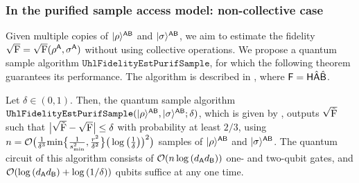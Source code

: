 


\subsubsection{In the purified sample access model: non-collective case}
\label{sec:fidelity estimation PSS}


Given multiple copies of $|\rho\rangle^{{\mathsf{A}}{\mathsf{B}}}$ and $|\sigma\rangle^{{\mathsf{A}}{\mathsf{B}}}$, we aim to estimate the fidelity $\sqrt{{\mathrm{F}}}=\sqrt{{\mathrm{F}}}(\rho^{\mathsf{A}}, \sigma^{\mathsf{A}})$ without using collective operations.
We propose a quantum sample algorithm $\mathtt{UhlFidelityEstPurifSample}$, for which the following theorem guarantees its performance.
The algorithm is described in , where ${\mathsf{F}}={\mathsf{H}}\hat{{\mathsf{A}}}\hat{{\mathsf{B}}}$.


\begin{theorem}
\label{thm:sqrtfidelestpufifsample}
Let $\delta \in (0, 1)$. Then, the quantum sample algorithm $\mathtt{UhlFidelityEstPurifSample}(|\rho\rangle^{{\mathsf{A}}{\mathsf{B}}}, |\sigma\rangle^{{\mathsf{A}}{\mathsf{B}}}; \delta)$,
which is given by , outputs $\sqrt{\tilde{{\mathrm{F}}}}$ such that $\big|\sqrt{\tilde{{\mathrm{F}}}} - \sqrt{{\mathrm{F}}}\big| \leq \delta$ with probability at least $2/3$, using $n = {\mathcal{O}}\big(\frac{1}{\delta^3}{\rm min}\big\{\frac{1}{s_{\rm min}^2}, \frac{r^2}{\delta^2}\big\}\big(\log{\big(\frac{1}{\delta}\big)}\big)^2\big)$ samples of $|\rho\rangle^{{\mathsf{A}}{\mathsf{B}}}$ and $|\sigma\rangle^{{\mathsf{A}}{\mathsf{B}}}$.
The quantum circuit of this algorithm consists of ${\mathcal{O}}(n\log{(d_{\mathsf{A}}d_{\mathsf{B}})})$ one- and two-qubit gates, and ${\mathcal{O}}(\log{(d_{\mathsf{A}}d_{\mathsf{B}})} + \log{(1/\delta)})$ qubits suffice at any one time.
\end{theorem}


 





